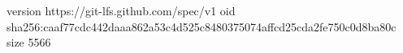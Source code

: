 version https://git-lfs.github.com/spec/v1
oid sha256:caaf77cdc442daaa862a53c4d525c8480375074affcd25cda2fe750c0d8ba80c
size 5566
